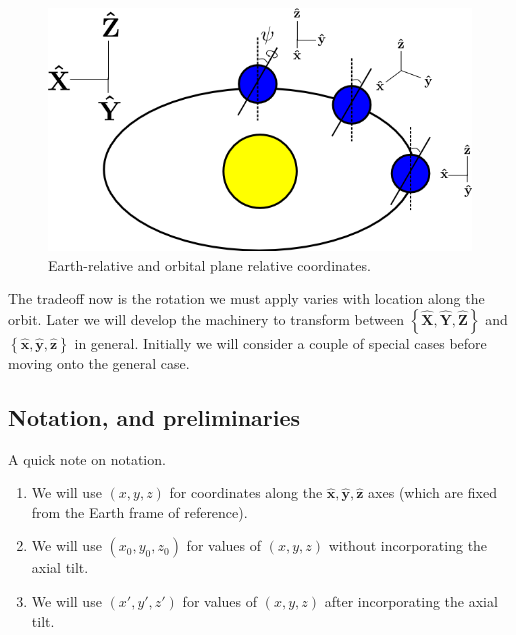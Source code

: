 \documentclass[10pt]{article}
\begin{document}
\begin{figure}[!h]
	\centering
		\includegraphics[width=140mm]{axialtilt_coords.png}
	\caption{Earth-relative and orbital plane relative coordinates.}
	\label{fig:axialtilt_coords}
\end{figure}

\vspace{10pt} The tradeoff now is the rotation we must apply varies with location along the orbit. Later we will develop the machinery to transform between $\left\{ \mathbf{\hat{X}}, \mathbf{\hat{Y}}, \mathbf{\hat{Z}} \right\}$ and $\left\{ \mathbf{\hat{x}}, \mathbf{\hat{y}}, \mathbf{\hat{z}} \right\}$ in general. Initially we will consider a couple of special cases before moving onto the general case.

\subsection{Notation, and preliminaries}

A quick note on notation. 

\begin{enumerate}
 \item We will use $(x, y, z)$ for coordinates along the $\mathbf{\hat{x}}, \mathbf{\hat{y}}, \mathbf{\hat{z}}$ axes (which are fixed from the Earth frame of reference).
 \item We will use $(x_0, y_0, z_0)$ for values of $(x, y, z)$ without incorporating the axial tilt.
 \item We will use $(x', y', z')$ for values of $(x, y, z)$ after incorporating the axial tilt.
\end{enumerate}
\end{document}
